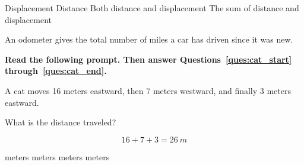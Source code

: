 \documentclass[]{exam}
\begin{document}
\begin{questions}
\begin{choices}
\choice Displacement
\CorrectChoice Distance
\choice Both distance and displacement
\choice The sum of distance and displacement
\end{choices}

\begin{solution}
An odometer gives the total number of miles a car has driven since it was new. 
\end{solution}


\begin{EnvUplevel}
\textbf{Read the following prompt. Then answer Questions~\ref{ques:cat_start} through~\ref{ques:cat_end}.} 
\end{EnvUplevel}
\vspace{-0.5em}

\begin{EnvUplevel}
A cat moves 16 meters eastward, then 7 meters westward, and finally 3 meters eastward.
\end{EnvUplevel}

\begin{figure}[h!]
    \centering
\end{figure}

\question \label{ques:cat_start}
What is the distance traveled?

\begin{solution}
\begin{equation*}
    16 + 7 + 3 = \SI{26}{m}
\end{equation*}
\end{solution}

\begin{choices}
 meters
 meters
 meters
 meters
\end{choices}


\end{questions}
\end{document}
